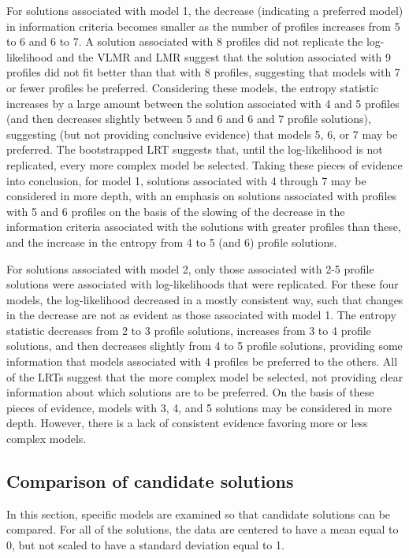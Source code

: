 \documentclass[]{book}
\theoremstyle{definition}
\theoremstyle{definition}
\theoremstyle{definition}
\theoremstyle{remark}
\begin{document}
For solutions associated with model 1, the decrease (indicating a
preferred model) in information criteria becomes smaller as the number
of profiles increases from 5 to 6 and 6 to 7. A solution associated with
8 profiles did not replicate the log-likelihood and the VLMR and LMR
suggest that the solution associated with 9 profiles did not fit better
than that with 8 profiles, suggesting that models with 7 or fewer
profiles be preferred. Considering these models, the entropy statistic
increases by a large amount between the solution associated with 4 and 5
profiles (and then decreases slightly between 5 and 6 and 6 and 7
profile solutions), suggesting (but not providing conclusive evidence)
that models 5, 6, or 7 may be preferred. The bootstrapped LRT suggests
that, until the log-likelihood is not replicated, every more complex
model be selected. Taking these pieces of evidence into conclusion, for
model 1, solutions associated with 4 through 7 may be considered in more
depth, with an emphasis on solutions associated with profiles with 5 and
6 profiles on the basis of the slowing of the decrease in the
information criteria associated with the solutions with greater profiles
than these, and the increase in the entropy from 4 to 5 (and 6) profile
solutions.

For solutions associated with model 2, only those associated with 2-5
profile solutions were associated with log-likelihoods that were
replicated. For these four models, the log-likelihood decreased in a
mostly consistent way, such that changes in the decrease are not as
evident as those associated with model 1. The entropy statistic
decreases from 2 to 3 profile solutions, increases from 3 to 4 profile
solutions, and then decreases slightly from 4 to 5 profile solutions,
providing some information that models associated with 4 profiles be
preferred to the others. All of the LRTs suggest that the more complex
model be selected, not providing clear information about which solutions
are to be preferred. On the basis of these pieces of evidence, models
with 3, 4, and 5 solutions may be considered in more depth. However,
there is a lack of consistent evidence favoring more or less complex
models.

\subsection{Comparison of candidate
solutions}\label{comparison-of-candidate-solutions}

In this section, specific models are examined so that candidate
solutions can be compared. For all of the solutions, the data are
centered to have a mean equal to 0, but not scaled to have a standard
deviation equal to 1.
\end{document}
